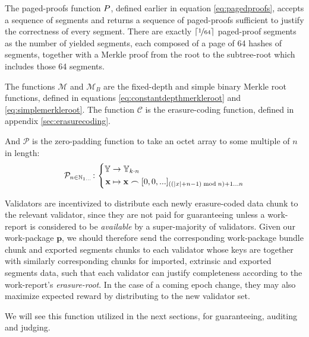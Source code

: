 
The paged-proofs function $P$, defined earlier in equation \ref{eq:pagedproofs}, accepts a sequence of segments and returns a sequence of paged-proofs sufficient to justify the correctness of every segment. There are exactly $\ceil{\nicefrac{1}{64}}$ paged-proof segments as the number of yielded segments, each composed of a page of 64 hashes of segments, together with a Merkle proof from the root to the subtree-root which includes those 64 segments.

The functions $\mathcal{M}$ and $\mathcal{M}_B$ are the fixed-depth and simple binary Merkle root functions, defined in equations \ref{eq:constantdepthmerkleroot} and \ref{eq:simplemerkleroot}. The function $\mathcal{C}$ is the erasure-coding function, defined in appendix \ref{sec:erasurecoding}.

And $\mathcal{P}$ is the zero-padding function to take an octet array to some multiple of $n$ in length:
\begin{equation}\label{eq:zeropadding}
  \mathcal{P}_{n \in \N_{1\dots}}\colon\left\{\begin{aligned}
    \Y &\to \Y_{k\cdot n}\\
    \mathbf{x} &\mapsto \mathbf{x} \concat [0, 0, ...]_{((|x|+n - 1) \bmod n) + 1 \dots n}
  \end{aligned}\right.
\end{equation}

Validators are incentivized to distribute each newly erasure-coded data chunk to the relevant validator, since they are not paid for guaranteeing unless a work-report is considered to be \emph{available} by a super-majority of validators. Given our work-package $\mathbf{p}$, we should therefore send the corresponding work-package bundle chunk and exported segments chunks to each validator whose keys are together with similarly corresponding chunks for imported, extrinsic and exported segments data, such that each validator can justify completeness according to the work-report's \emph{erasure-root}. In the case of a coming epoch change, they may also maximize expected reward by distributing to the new validator set.

We will see this function utilized in the next sections, for guaranteeing, auditing and judging.

\undef{\newavailabilityspecifier}
\undef{\itemtoresult}
\undef{\countupexports}
\undef{\importsegmentdata}
\undef{\pagedproofs}
\undef{\marshallrefine}
\undef{\extrinsicdata}
\undef{\wpX}
\undef{\wiX}